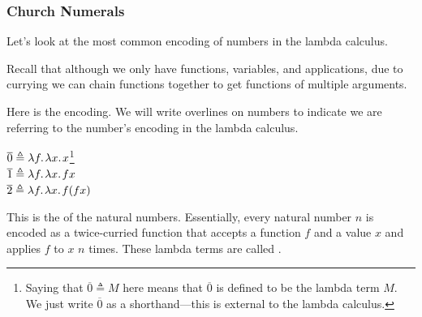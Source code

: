 \documentclass[aspectratio=169, handout]{beamer}
\newcommand{\lam}[1]{\lambda #1{.}\mkern2mu}
\begin{document}
\begin{frame}[fragile]
  \frametitle{Church Numerals}

  Let's look at the most common encoding of numbers in the lambda calculus.

  \pause
  \vspace{\fill}

  Recall that although we only have functions, variables, and applications,
  due to currying we can chain functions together to get functions of
  multiple arguments.

  \pause
  \vspace{\fill}

  Here is the encoding. We will write overlines on numbers to indicate we
  are referring to the number's encoding in the lambda calculus.

  \pause
  \vspace{\fill}

  \vspace{-5pt}
  { \large
  \begin{center}
    $\overline{0} \triangleq \lam{f} \lam{x} x$\footnote{Saying that $\overline{0} \triangleq M$ here means
    that $\overline{0}$ is defined to be the lambda term $M$. We just
    write $\overline{0}$ as a shorthand---this is external to the lambda calculus.} \\
    $\overline{1} \triangleq \lam{f} \lam{x} f x$ \\
    $\overline{2} \triangleq \lam{f} \lam{x} f (f x)$
  \end{center}
  }
  \vspace{-5pt}

  \pause
  \vspace{\fill}

  This is the  of the natural numbers. Essentially,
  every natural number $n$ is encoded as a twice-curried function that
  accepts a function $f$ and a value $x$ and applies $f$ to $x$ $n$ times.
  These lambda terms are called .
\end{frame}
\end{document}

